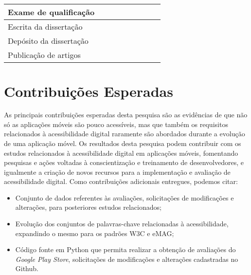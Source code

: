 \begin{table}[h]
\begin{tabular}{|l|c|c|c|c|c|c|c|c|}
  Exame de qualificação
  & \x & \x & \x & \x & \x  & \y & \x & \x \\
  \hline  
  
  Escrita da dissertação
  & \x & \x & \x & \x & \x  & \x & \y & \y \\
  \hline  
  
  Depósito da dissertação
  & \x & \x & \x & \x & \x  & \x & \x & \y \\
  \hline  
  
  Publicação de artigos
  & \x & \x & \y & \x & \x  & \x & \x & \y \\
  \hline  
  
 
\end{tabular}
 \normalsize
\end{table}




\section{Contribuições Esperadas}
As principais contribuições esperadas desta pesquisa são as evidências de que não só as aplicações móveis são pouco acessíveis, mas que também os requisitos relacionados à acessibilidade digital raramente são abordados durante a evolução de uma aplicação móvel.
Os resultados desta pesquisa podem contribuir com os estudos relacionados à acessibilidade digital em aplicações móveis, fomentando pesquisas e ações voltadas à conscientização e treinamento de desenvolvedores, e igualmente a criação de novos recursos para
a implementação e avaliação de acessibilidade digital.
Como contribuições adicionais entregues, podemos citar:

\begin{itemize}
	\item Conjunto de dados referentes às avaliações, solicitações de modificações e alterações, para posteriores estudos relacionados;
	\item Evolução dos conjuntos de palavras-chave relacionadas à acessibilidade, expandindo o mesmo para os padrões W3C e eMAG;
	\item Código fonte em Python que permita realizar a obtenção de avaliações do \textit{Google Play Store}, solicitações de modificações e alterações cadastradas no Github.
\end{itemize}



